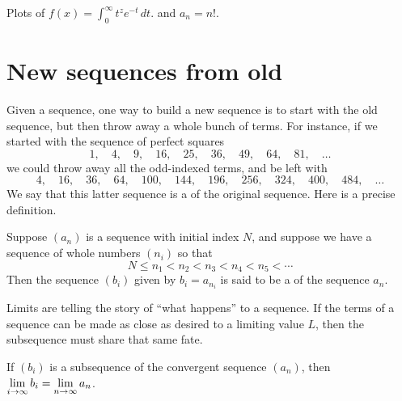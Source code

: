 \begin{marginfigure}[0in]
\caption{Plots of $f(x) = \int_0^\infty t^{z} e^{-t} \, dt.$ and $a_n = n!$.}
\label{fig:gamma-function}
\end{marginfigure}

\section{New sequences from old}

Given a sequence, one way to build a new sequence is to start with the
old sequence, but then throw away a whole bunch of terms.  For
instance, if we started with the sequence of perfect squares
$$
1,\quad 4,\quad 9,\quad 16,\quad 25,\quad 36,\quad 49,\quad 64,\quad 81,\quad\ldots
$$
we could throw away all the odd-indexed terms, and be left with
$$
4,\quad 16,\quad 36,\quad 64,\quad 100,\quad 144,\quad 196,\quad 256,\quad 324,\quad 400,\quad 484,\quad\ldots
$$
We say that this latter sequence is a
of the original sequence.  Here is a precise definition.

\begin{definition}
  Suppose $(a_n)$ is a sequence with initial index $N$, and suppose we have a sequence of whole numbers $(n_i)$ so that
  $$
  N \leq n_1 < n_2 < n_3 < n_4 < n_5 < \cdots 
  $$
  Then the sequence $(b_i)$ given by $b_i = a_{n_i}$ is said to be a 
  of the sequence $a_n$.
\end{definition}

Limits are telling the story of ``what happens'' to a sequence.  If
the terms of a sequence can be made as close as desired to a limiting
value $L$, then the subsequence must share that same fate.

\begin{theorem}
  \label{theorem:subsequence-same-limit}
  If $(b_i)$ is a subsequence of the convergent sequence $(a_n)$, then
  $\displaystyle\lim_{i \to \infty} b_i = \displaystyle\lim_{n \to \infty} a_n$.
\end{theorem}

